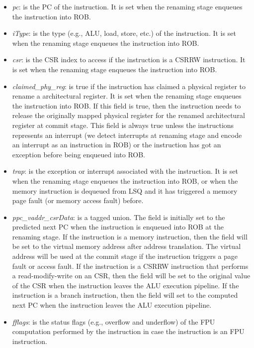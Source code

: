 \begin{itemize}
    \item \emph{pc}: is the PC of the instruction.
    It is set when the renaming stage enqueues the instruction into ROB.
    \item \emph{iType}: is the type (e.g., ALU, load, store, etc.) of the instruction.
    It is set when the renaming stage enqueues the instruction into ROB.
    \item \emph{csr}: is the CSR index to access if the instruction is a CSRRW instruction.
    It is set when the renaming stage enqueues the instruction into ROB.
    \item \emph{claimed\_phy\_reg}: is true if the instruction has claimed a physical register to rename a architectural register.
    It is set when the renaming stage enqueues the instruction into ROB.
    If this field is true, then the instruction needs to release the originally mapped physical register for the renamed architectural register at commit stage.
    This field is always true unless the instructions represents an interrupt (we detect interrupts at renaming stage and encode an interrupt as an instruction in ROB) or the instruction has got an exception before being enqueued into ROB.
    \item \emph{trap}: is the exception or interrupt associated with the instruction.
    It is set when the renaming stage enqueues the instruction into ROB, or when the memory instruction is dequeued from LSQ and it has triggered a memory page fault (or memory access fault) before.
    \item \emph{ppc\_vaddr\_csrData}: is a tagged union.
    The field is initially set to the predicted next PC when the instruction is enqueued into ROB at the renaming stage.
    If the instruction is a memory instruction, then the field will be set to the virtual memory address after address translation.
    The virtual address will be used at the commit stage if the instruction triggers a page fault or access fault.
    If the instruction is a CSRRW instruction that performs a read-modify-write on an CSR, then the field will be set to the original value of the CSR when the instruction leaves the ALU execution pipeline.
    If the instruction is a branch instruction, then the field will set to the computed next PC when the instruction leaves the ALU execution pipeline.
    \item \emph{fflags}: is the status flags (e.g., overflow and underflow) of the FPU computation performed by the instruction in case the instruction is an FPU instruction.

\end{itemize}
